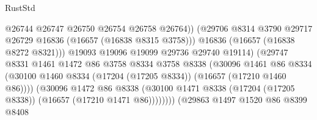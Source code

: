 \begin{lexlean}{RustStd}
\begin{coremodule}
                                            @26744
                                            @26747
                                            @26750
                                            @26754
                                            @26758
                                            @26764))
                                        (@29706
                                          @8314
                                          @3790
                                          @29717
                                          @26729
                                          @16836
                                          (@16657 (@16838 @8315 @3758)))
                                        @16836
                                        (@16657 (@16838 @8272 @8321)))
                                      @19093
                                      @19096
                                      @19099
                                      @29736
                                      @29740
                                      @19114)
                                    (@29747
                                      @8331
                                      @1461
                                      @1472
                                      @86
                                      @3758
                                      @8334
                                      @3758
                                      @8338
                                      (@30096
                                        @1461
                                        @86
                                        @8334
                                        (@30100
                                          @1460
                                          @8334
                                          (@17204 (@17205 @8334))
                                          (@16657 (@17210 @1460 @86))))
                                      (@30096
                                        @1472
                                        @86
                                        @8338
                                        (@30100
                                          @1471
                                          @8338
                                          (@17204 (@17205 @8338))
                                          (@16657 (@17210 @1471 @86))))))))
                              (@29863
                                @1497
                                @1520
                                @86
                                @8399
                                @8408

\end{coremodule}
\end{lexlean}
